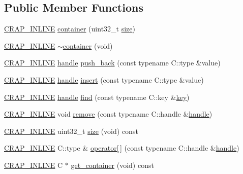 \subsection*{Public Member Functions}
\begin{DoxyCompactItemize}
\item 
\hyperlink{config__x86_8h_a5a40526b8d842e7ff731509998bb0f1c}{C\+R\+A\+P\+\_\+\+I\+N\+L\+I\+N\+E} \hyperlink{classcrap_1_1container_a191480d8b2823a265d97cef7e695123f}{container} (uint32\+\_\+t \hyperlink{classcrap_1_1container_a5b29ee6f9976595e3f5e74e9ecbc6bc0}{size})
\item 
\hyperlink{config__x86_8h_a5a40526b8d842e7ff731509998bb0f1c}{C\+R\+A\+P\+\_\+\+I\+N\+L\+I\+N\+E} \hyperlink{classcrap_1_1container_a265000260efc3371cb53084cc917fdc4}{$\sim$container} (void)
\item 
\hyperlink{config__x86_8h_a5a40526b8d842e7ff731509998bb0f1c}{C\+R\+A\+P\+\_\+\+I\+N\+L\+I\+N\+E} \hyperlink{classcrap_1_1container_acc6e787516e0ca6f07b767a782a582a4}{handle} \hyperlink{classcrap_1_1container_a1cc8427fa675407108f861b17af43225}{push\+\_\+back} (const typename C\+::type \&value)
\item 
\hyperlink{config__x86_8h_a5a40526b8d842e7ff731509998bb0f1c}{C\+R\+A\+P\+\_\+\+I\+N\+L\+I\+N\+E} \hyperlink{classcrap_1_1container_acc6e787516e0ca6f07b767a782a582a4}{handle} \hyperlink{classcrap_1_1container_a1a5a31ee7e299314e21ded844a3396d3}{insert} (const typename C\+::type \&value)
\item 
\hyperlink{config__x86_8h_a5a40526b8d842e7ff731509998bb0f1c}{C\+R\+A\+P\+\_\+\+I\+N\+L\+I\+N\+E} \hyperlink{classcrap_1_1container_acc6e787516e0ca6f07b767a782a582a4}{handle} \hyperlink{classcrap_1_1container_a0c73de215855bc5678a465fc7265c2c2}{find} (const typename C\+::key \&\hyperlink{classcrap_1_1container_ab8883be30faed0c7e4ac1128376a3d74}{key})
\item 
\hyperlink{config__x86_8h_a5a40526b8d842e7ff731509998bb0f1c}{C\+R\+A\+P\+\_\+\+I\+N\+L\+I\+N\+E} void \hyperlink{classcrap_1_1container_aee159a5c9ec363840377e6bcaaf101d9}{remove} (const typename C\+::handle \&\hyperlink{classcrap_1_1container_acc6e787516e0ca6f07b767a782a582a4}{handle})
\item 
\hyperlink{config__x86_8h_a5a40526b8d842e7ff731509998bb0f1c}{C\+R\+A\+P\+\_\+\+I\+N\+L\+I\+N\+E} uint32\+\_\+t \hyperlink{classcrap_1_1container_a5b29ee6f9976595e3f5e74e9ecbc6bc0}{size} (void) const 
\item 
\hyperlink{config__x86_8h_a5a40526b8d842e7ff731509998bb0f1c}{C\+R\+A\+P\+\_\+\+I\+N\+L\+I\+N\+E} C\+::type \& \hyperlink{classcrap_1_1container_a1a09ac8b3f524914813b9e5f6445872c}{operator\mbox{[}$\,$\mbox{]}} (const typename C\+::handle \&\hyperlink{classcrap_1_1container_acc6e787516e0ca6f07b767a782a582a4}{handle})
\item 
\hyperlink{config__x86_8h_a5a40526b8d842e7ff731509998bb0f1c}{C\+R\+A\+P\+\_\+\+I\+N\+L\+I\+N\+E} C $\ast$ \hyperlink{classcrap_1_1container_ae80e9b4837c16996b6ce3a8abd4f8556}{get\+\_\+container} (void) const 
\end{DoxyCompactItemize}


